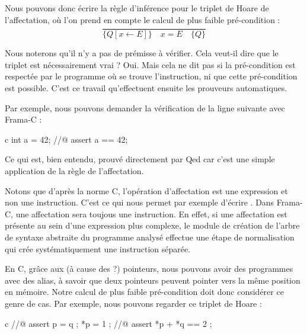 Nous pouvons donc écrire la règle d'inférence pour le triplet de Hoare de 
l'affectation, où l'on prend en compte le calcul de plus faible pré-condition :
$$\dfrac{}{\{Q[x \leftarrow E] \}\quad x = E \quad\{ Q \}}$$


Nous noterons qu'il n'y a pas de prémisse à vérifier. Cela veut-il dire que le
triplet est nécessairement vrai ? Oui. Mais cela ne dit pas si la pré-condition 
est respectée par le programme où se trouve l'instruction, ni que cette 
pré-condition est possible. C'est ce travail qu'effectuent ensuite les prouveurs
automatiques.



Par exemple, nous pouvons demander la vérification de la ligne suivante avec 
Frama-C :



\begin{CodeBlock}{c}
int a = 42;
//@ assert a == 42;
\end{CodeBlock}



Ce qui est, bien entendu, prouvé directement par Qed car c'est une simple 
application de la règle de l'affectation.



\begin{Information}
Notons que d'après la norme C, l'opération d'affectation est une expression
et non une instruction. C'est ce qui nous permet par exemple d'écrire 
. Dans Frama-C, une affectation sera toujous une
instruction. En effet, si une affectation est présente au sein d'une 
expression plus complexe, le module de création de l'arbre de syntaxe abstraite
du programme analysé effectue une étape de normalisation qui crée 
systématiquement une instruction séparée.
\end{Information}





En C, grâce aux (à cause des ?) pointeurs, nous pouvons avoir des programmes avec
des alias, à savoir que deux pointeurs peuvent pointer vers la même position en 
mémoire. Notre calcul de plus faible pré-condition doit donc considérer ce genre
de cas. Par exemple, nous pouvons regarder ce triplet de Hoare :


\begin{CodeBlock}{c}
//@ assert p = q ;
*p = 1 ;
//@ assert *p + *q == 2 ;
\end{CodeBlock}



